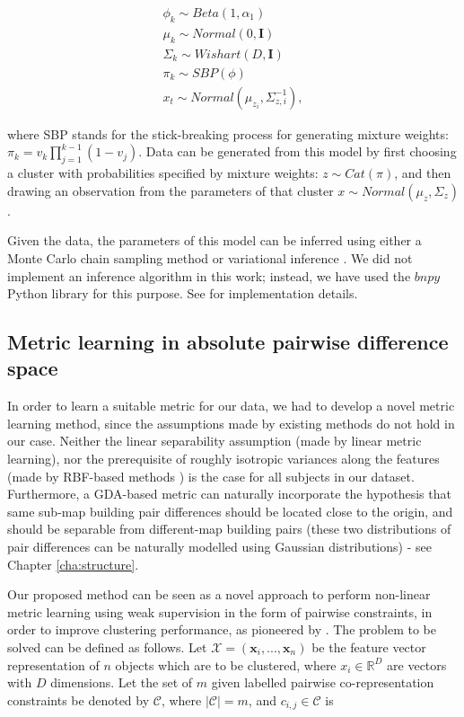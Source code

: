 \begin{equation}
\label{eq:dpgmm}
\begin{array}{rcl}
\phi_k   \sim Beta(1, \alpha_1) \\
\mu_k    \sim Normal(0,  \mathbf{I}) \\
\Sigma_k \sim Wishart(D, \mathbf{I}) \\
\pi_{k}  \sim SBP(\phi) \\
x_t \sim Normal(\mu_{z_i},  \Sigma_{z,i}^{-1}),
\end{array}
\end{equation}

where SBP stands for the stick-breaking process for generating mixture weights: $\pi_k=v_k \prod_{j=1}^{k-1} (1-v_j)$. Data can be generated from this model by first choosing a cluster with probabilities specified by mixture weights: $z \sim Cat(\pi)$, and then drawing an observation from the parameters of that cluster $x \sim Normal(\mu_z, \Sigma_z)$.

Given the data, the parameters of this model can be inferred using either a Monte Carlo chain sampling method \citep{neal2000markov} or variational inference \citep{blei2006variational}. We did not implement an inference algorithm in this work; instead, we have used the $bnpy$ Python library for this purpose. See \citep{hughes2013memoized} for implementation details.

\subsection{Metric learning in absolute pairwise difference space}

In order to learn a suitable metric for our data, we had to develop a novel metric learning method, since the assumptions made by existing methods do not hold in our case. Neither the linear separability assumption (made by linear metric learning), nor the prerequisite of roughly isotropic variances along the features (made by RBF-based methods \citep{ong2005learning}) is the case for all subjects in our dataset. Furthermore, a GDA-based metric can naturally incorporate the hypothesis that same sub-map building pair differences should be located close to the origin, and should be separable from different-map building pairs (these two distributions of pair differences can be naturally modelled using Gaussian distributions) - see Chapter \ref{cha:structure}. 

Our proposed method can be seen as a novel approach to perform non-linear metric learning using weak supervision in the form of pairwise constraints, in order to improve clustering performance, as pioneered by \cite{xing2002distance}. The problem to be solved can be defined as follows. Let $\mathcal{X}=(\boldsymbol x_i, ..., \boldsymbol x_n)$ be the feature vector representation of $n$ objects which are to be clustered, where $x_i \in \mathbb{R}^D$ are vectors with $D$ dimensions. Let the set of $m$ given labelled pairwise co-representation constraints be denoted by $\mathcal{C}$, where $ \lvert \mathcal{C} \lvert = m $, and $c_{i,j} \in \mathcal{C}$ is

